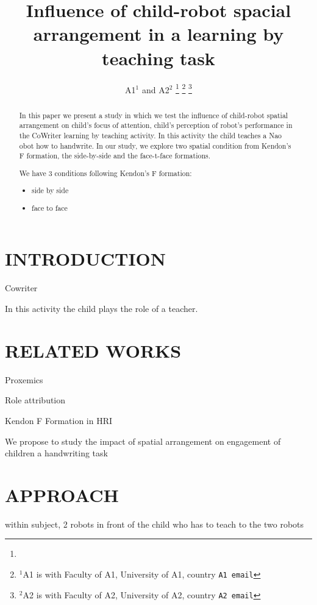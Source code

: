 \documentclass[letterpaper, 10 pt, conference]{ieeeconf}  %
\title{\LARGE \bf
Influence of child-robot spacial arrangement in a learning by teaching task}
\author{A1$^{1}$ and A2$^{2}$%
\thanks{}%
\thanks{$^{1}$A1 is with Faculty of A1,
        University of A1, country
        {\tt\small A1 email}}%
\thanks{$^{2}$A2 is with Faculty of A2,
        University of A2, country
        {\tt\small A2 email}}%
}
\begin{document}
\maketitle
\thispagestyle{empty}
\pagestyle{empty}


\begin{abstract}
In this paper we present a study in which we test the influence of child-robot spatial arrangement on child's focus of attention, child's perception of robot's performance in the CoWriter learning by teaching activity.
In this activity the child teaches a Nao obot how to handwrite. 
In our study, we explore two spatial condition from Kendon's F formation, the side-by-side and the face-t-face formations. 

We have 3 conditions following Kendon's F formation: 
\begin{itemize}
\item side by side
\item face to face
\end{itemize}



\end{abstract}


\section{INTRODUCTION}
Cowriter

In this activity the child plays the role of a teacher. 



\section{RELATED WORKS}
Proxemics

Role attribution

Kendon F Formation in HRI
\cite{huttenrauch2006investigating}

We propose to study the impact of spatial arrangement on engagement of children a handwriting task
\section{APPROACH}

within subject, 2 robots in front of the child who has to teach to the two robots
\end{document}
